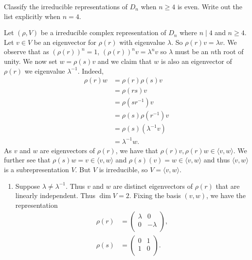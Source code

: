 \begin{questions}
  \setcounter{question}{5}
  \question Classify the irreducible representations of $D_n$ when $n \geq 4$ is even. Write out the list explicitly when $n = 4$.
  \begin{solution}
    Let $(\rho, V)$ be a irreducible complex representation of $D_n$ where $n \mid 4$ and $n \geq 4$. Let $v \in V$ be an eigenvector for $\rho(r)$ with eigenvalue $\lambda$. So $\rho(r) v = \lambda v$. We observe that as $(\rho(r))^n = 1$, $(\rho(r))^nv = \lambda^n v$ so $\lambda$ must be an $n$th root of unity.
    We now set $w = \rho(s) v$ and we claim that $w$ is also an eigenvector of $\rho(r)$ we eigenvalue $\lambda^{-1}$. Indeed,
    \begin{align*}
      \rho(r)w & = \rho(r) \rho(s) v        \\
               & = \rho(rs) v               \\
               & = \rho(sr^{-1}) v          \\
               & = \rho(s) \rho(r^{-1}) v   \\
               & = \rho(s) (\lambda^{-1} v) \\
               & = \lambda^{-1} w.
    \end{align*}
    As $v$ and $w$ are eigenvectors of $\rho(r)$, we have that $\rho(r)v, \rho(r)w \in \langle v, w \rangle$. We further see that $\rho(s)w = v \in \langle v, w \rangle$ and $\rho(s)(v) = w \in \langle v, w \rangle$ and thus $\langle v,w \rangle$ is a subrepresentation $V$. But $V$ is irreducible, so $V = \langle v, w \rangle$.
    \begin{enumerate}
      \item Suppose $\lambda \neq \lambda^{-1}$. Thus $v$ and $w$ are distinct eigenvectors of $\rho(r)$ that are linearly independent. Thus $\dim V = 2$. Fixing the basis $(v,w)$, we have the representation
            \begin{align*}
              \rho(r) & =
              \begin{pmatrix}
                \lambda & 0        \\
                0       & -\lambda \\
              \end{pmatrix},
              \\
              \rho(s) & =
              \begin{pmatrix}
                0 & 1 \\
                1 & 0 \\
              \end{pmatrix}.

\end{align*}
\end{enumerate}
\end{solution}
\end{questions}
